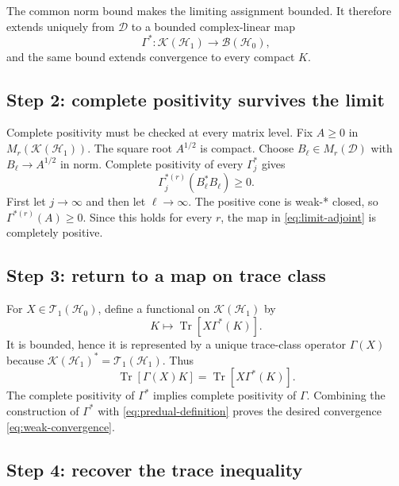 \documentclass[11pt]{article}
\newcommand{\Hc}{\mathcal H}
\newcommand{\T}{\mathcal T_1}
\newcommand{\K}{\mathcal K}
\newcommand{\Bop}{\mathcal B}
\newcommand{\Tr}{\operatorname{Tr}}
\begin{document}
The common norm bound makes the limiting assignment bounded.  It therefore
extends uniquely from $\mathcal D$ to a bounded complex-linear map
\begin{equation}\label{eq:limit-adjoint}
  \Gamma^*:\K(\Hc_1)\longrightarrow\Bop(\Hc_0),
\end{equation}
and the same bound extends convergence to every compact $K$.

\subsection*{Step 2: complete positivity survives the limit}

Complete positivity must be checked at every matrix level.  Fix
$A\geq0$ in $M_r(\K(\Hc_1))$.  The square root $A^{1/2}$ is compact.
Choose $B_\ell\in M_r(\mathcal D)$ with
$B_\ell\to A^{1/2}$ in norm.  Complete positivity of every
$\Gamma_j^*$ gives
\[
  \Gamma_j^{*(r)}(B_\ell^*B_\ell)\geq0.
\]
First let $j\to\infty$ and then let $\ell\to\infty$.  The positive cone is
weak-* closed, so $\Gamma^{*(r)}(A)\geq0$.  Since this holds for every $r$,
the map in \eqref{eq:limit-adjoint} is completely positive.

\subsection*{Step 3: return to a map on trace class}

For $X\in\T(\Hc_0)$, define a functional on $\K(\Hc_1)$ by
\[
  K\longmapsto\Tr[X\Gamma^*(K)].
\]
It is bounded, hence it is represented by a unique trace-class operator
$\Gamma(X)$ because $\K(\Hc_1)^*=\T(\Hc_1)$.  Thus
\begin{equation}\label{eq:predual-definition}
  \Tr[\Gamma(X)K]=\Tr[X\Gamma^*(K)].
\end{equation}
The complete positivity of $\Gamma^*$ implies complete positivity of
$\Gamma$.  Combining the construction of $\Gamma^*$ with
\eqref{eq:predual-definition} proves the desired convergence
\eqref{eq:weak-convergence}.

\subsection*{Step 4: recover the trace inequality}
\end{document}
